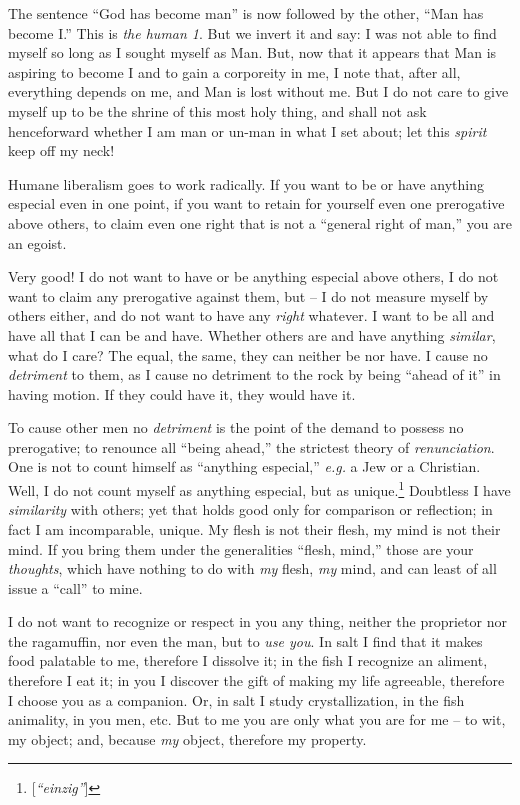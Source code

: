 The sentence ``God has become man'' is now followed by the other, ``Man has 
become I.'' This is \textit{the human 1}. But we invert it and say: I was not 
able to find myself so long as I sought myself as Man. But, now that it 
appears that Man is aspiring to become I and to gain a corporeity in me, I 
note that, after all, everything depends on me, and Man is lost without me. 
But I do not care to give myself up to be the shrine of this most holy thing, 
and shall not ask henceforward whether I am man or un-man in what I set about; 
let this \textit{spirit} keep off my neck!

Humane liberalism goes to work radically. If you want to be or have anything 
especial even in one point, if you want to retain for yourself even one 
prerogative above others, to claim even one right that is not a ``general 
right of man,'' you are an egoist.

Very good! I do not want to have or be anything especial above others, I do 
not want to claim any prerogative against them, but -- I do not measure myself 
by others either, and do not want to have any \textit{right} whatever. I want 
to be all and have all that I can be and have. Whether others are and have 
anything \textit{similar}, what do I care? The equal, the same, they can 
neither be nor have. I cause no \textit{detriment} to them, as I cause no 
detriment to the rock by being ``ahead of it'' in having motion. If they 
could have it, they would have it.

To cause other men no \textit{detriment} is the point of the demand to possess 
no prerogative; to renounce all ``being ahead,'' the strictest theory of 
\textit{renunciation}. One is not to count himself as ``anything especial,'' 
\textit{e.g.} a Jew or a Christian. Well, I do not count myself as anything 
especial, but as unique.\footnote{[\textit{``einzig''}]} Doubtless I have 
\textit{similarity} with others; yet that holds good only for comparison or 
reflection; in fact I am incomparable, unique. My flesh is not their flesh, my 
mind is not their mind. If you bring them under the generalities ``flesh, 
mind,'' those are your \textit{thoughts}, which have nothing to do with 
\textit{my} flesh, \textit{my} mind, and can least of all issue a ``call'' 
to mine.

I do not want to recognize or respect in you any thing, neither the proprietor 
nor the ragamuffin, nor even the man, but to \textit{use you}. In salt I find 
that it makes food palatable to me, therefore I dissolve it; in the fish I 
recognize an aliment, therefore I eat it; in you I discover the gift of making 
my life agreeable, therefore I choose you as a companion. Or, in salt I study 
crystallization, in the fish animality, in you men, etc. But to me you are 
only what you are for me -- to wit, my object; and, because \textit{my} 
object, therefore my property.

